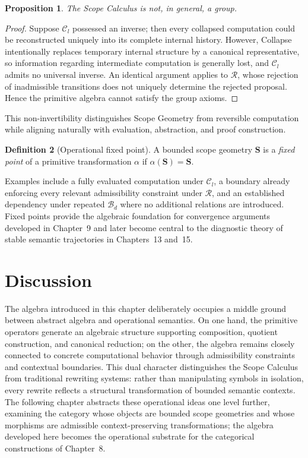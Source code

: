 \documentclass[11pt,twoside,openright]{book}
\numberwithin{equation}{chapter}
\theoremstyle{definition}
\newtheorem{definition}{Definition}[chapter]
\theoremstyle{plain}
\newtheorem{proposition}[definition]{Proposition}
\theoremstyle{remark}
\theoremstyle{definition}
\newcommand{\Scope}{\mathbf{S}}
\newcommand{\Refuse}{\mathcal{R}}
\newcommand{\Bind}{\mathcal{B}_d}
\newcommand{\Collapse}{\mathcal{C}_l}
\begin{document}
\begin{proposition}
The Scope Calculus is not, in general, a group.
\end{proposition}

\begin{proof}
Suppose $\Collapse$ possessed an inverse; then every collapsed computation
could be reconstructed uniquely into its complete internal history.
However, Collapse intentionally replaces temporary internal structure by
a canonical representative, so information regarding intermediate
computation is generally lost, and $\Collapse$ admits no universal
inverse. An identical argument applies to $\Refuse$, whose rejection of
inadmissible transitions does not uniquely determine the rejected
proposal. Hence the primitive algebra cannot satisfy the group axioms.
\end{proof}

This non-invertibility distinguishes Scope Geometry from reversible
computation while aligning naturally with evaluation, abstraction, and
proof construction.

\begin{definition}[Operational fixed point]
A bounded scope geometry $\Scope$ is a \emph{fixed point} of a primitive
transformation $\alpha$ if $\alpha(\Scope)=\Scope$.
\end{definition}

Examples include a fully evaluated computation under $\Collapse$, a
boundary already enforcing every relevant admissibility constraint under
$\Refuse$, and an established dependency under repeated $\Bind$ where no
additional relations are introduced. Fixed points provide the algebraic
foundation for convergence arguments developed in Chapter~9 and later
become central to the diagnostic theory of stable semantic trajectories
in Chapters~13 and~15.

\section{Discussion}

The algebra introduced in this chapter deliberately occupies a middle
ground between abstract algebra and operational semantics. On one hand,
the primitive operators generate an algebraic structure supporting
composition, quotient construction, and canonical reduction; on the
other, the algebra remains closely connected to concrete computational
behavior through admissibility constraints and contextual boundaries.
This dual character distinguishes the Scope Calculus from traditional
rewriting systems: rather than manipulating symbols in isolation, every
rewrite reflects a structural transformation of bounded semantic
contexts. The following chapter abstracts these operational ideas one
level further, examining the category whose objects are bounded scope
geometries and whose morphisms are admissible context-preserving
transformations; the algebra developed here becomes the operational
substrate for the categorical constructions of Chapter~8.
\end{document}
